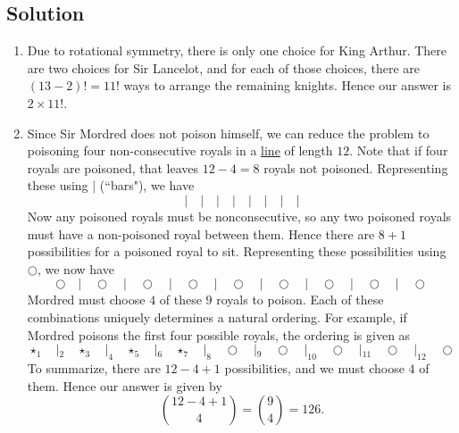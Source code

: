 \documentclass{article}
\begin{document}
\subsection*{Solution}
    \begin{enumerate}
        \item Due to rotational symmetry, there is only one choice for King Arthur. There are two choices for Sir Lancelot, and for each of those choices, there are $(13 - 2)! = 11!$ ways to arrange the remaining knights. Hence our answer is $2 \times 11!$.
        \item Since Sir Mordred does not poison himself, we can reduce the problem to poisoning four non-consecutive royals in a \underline{line} of length $12$. Note that if four royals are poisoned, that leaves $12 - 4 = 8$ royals not poisoned. Representing these using $\mid$ (``bars"), we have $$| \quad | \quad | \quad | \quad | \quad | \quad | \quad |$$ Now any poisoned royals must be nonconsecutive, so any two poisoned royals must have a non-poisoned royal between them. Hence there are $8 + 1$ possibilities for a poisoned royal to sit. Representing these possibilities using $\bigcirc$, we now have $$\bigcirc \quad | \quad \bigcirc \quad | \quad \bigcirc \quad | \quad \bigcirc \quad | \quad \bigcirc \quad | \quad \bigcirc \quad | \quad \bigcirc \quad | \quad \bigcirc \quad | \quad \bigcirc$$ Mordred must choose $4$ of these $9$ royals to poison. Each of these combinations uniquely determines a natural ordering. For example, if Mordred poisons the first four possible royals, the ordering is given as
        $$\star_{1} \quad |_{2} \quad \star_{3} \quad |_{4} \quad \star_{5} \quad |_{6} \quad \star_{7} \quad |_{8} \quad \bigcirc \quad |_{9} \quad \bigcirc \quad |_{10} \quad \bigcirc \quad |_{11} \quad \bigcirc \quad |_{12} \quad \bigcirc$$
        To summarize, there are $12 - 4 + 1$ possibilities, and we must choose $4$ of them. Hence our answer is given by $$\binom{12 - 4 + 1}{4} = \binom{9}{4} = 126.$$
        

\end{enumerate}
\end{document}
